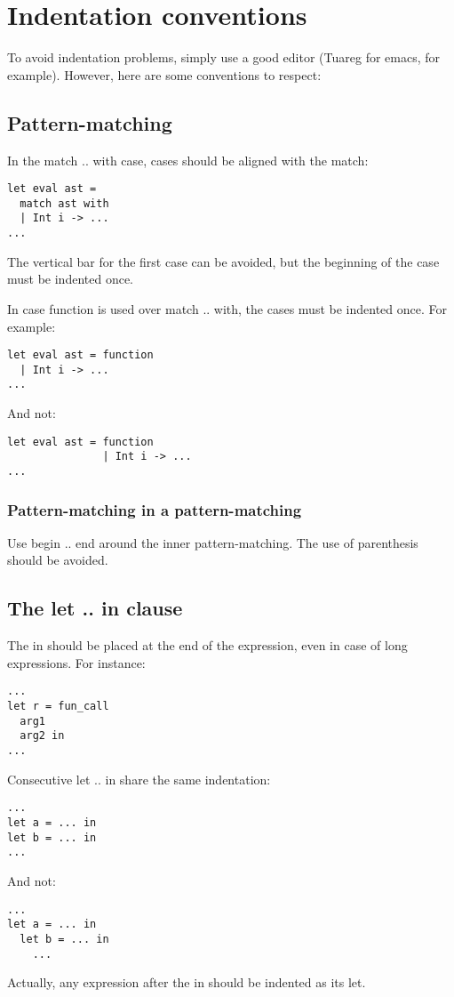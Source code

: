 \documentclass{article}
\begin{document}
\section{Indentation conventions}

To avoid indentation problems, simply use a good editor (Tuareg for emacs, for
example). However, here are some conventions to respect:

\subsection*{Pattern-matching}

In the \textsf{match .. with} case, cases should be aligned with the
\textsf{match}:

\begin{verbatim}
let eval ast =
  match ast with
  | Int i -> ...
...
\end{verbatim}

The vertical bar for the first case can be avoided, but the beginning of the
case must be indented once.

In case \textsf{function} is used over \textsf{match .. with}, the cases must be
indented once. For example:

\begin{verbatim}
let eval ast = function
  | Int i -> ...
...
\end{verbatim}

And not:


\begin{verbatim}
let eval ast = function
               | Int i -> ...
...
\end{verbatim}

\subsubsection*{Pattern-matching in a pattern-matching}

\medskip

Use \textsf{begin .. end} around the inner pattern-matching. The use of
parenthesis should be avoided.

\subsection*{The \textsf{let .. in} clause}

The \textsf{in} should be placed at the end of the expression, even in case of
long expressions. For instance:

\begin{verbatim}
...
let r = fun_call
  arg1
  arg2 in
...
\end{verbatim}

Consecutive \textsf{let .. in} share the same indentation:

\begin{verbatim}
...
let a = ... in
let b = ... in
...
\end{verbatim}

And not:

\begin{verbatim}
...
let a = ... in
  let b = ... in
    ...
\end{verbatim}

Actually, any expression after the \textsf{in} should be indented as its
\textsf{let}.
\end{document}
